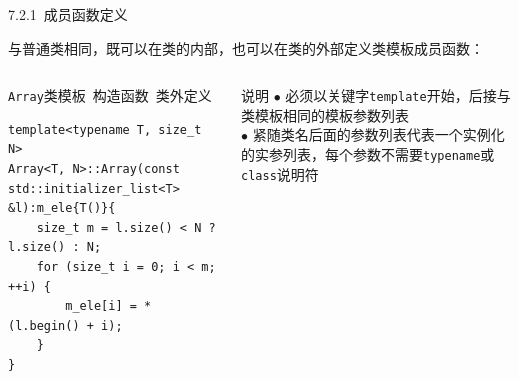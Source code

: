 \begin{frame}[fragile]{7.2.1~成员函数定义}

与普通类相同，既可以在类的内部，也可以在\alert{类的外部}定义\alert{类模板成员函数}：

\vspace{-4mm}

\begin{columns}[t]

\begin{blueblock}{\texttt{Array}类模板~构造函数~类外定义}
\begin{lstlisting}[moreemph={T,Array,initializer}]
template<typename T, size_t N>
Array<T, N>::Array(const std::initializer_list<T> &l):m_ele{T()}{
    size_t m = l.size() < N ? l.size() : N;
    for (size_t i = 0; i < m; ++i) {
        m_ele[i] = *(l.begin() + i);
    }
}
\end{lstlisting}
\end{blueblock}

\begin{yellowblock}{说明}
$\bullet$ 必须以关键字\texttt{template}开始，后接\alert{与类模板相同}的模板参数列表\\
$\bullet$ 紧随类名后面的参数列表代表一个实例化的实参列表，每个参数不需要\texttt{typename}或\texttt{class}说明符
\end{yellowblock}

\end{columns}

\end{frame}


